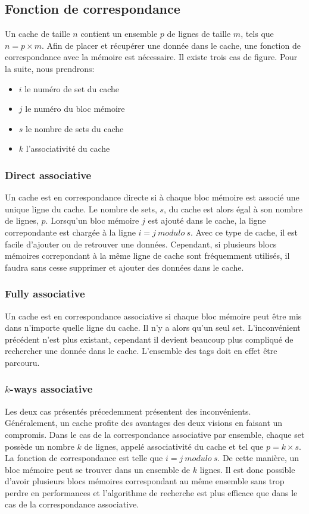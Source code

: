 \documentclass[a4paper]{article}
\begin{document}
\subsection{Fonction de correspondance}
\indent Un cache de taille $n$ contient un ensemble $p$ de lignes de taille $m$, tels que $n = p \times m$. Afin de placer et récupérer une donnée dans le cache, une fonction de correspondance avec la mémoire est nécessaire. Il existe trois cas de figure. Pour la suite, nous prendrons: \\
\begin{itemize}
\item $i$ le numéro de set du cache
\item $j$ le numéro du bloc mémoire
\item $s$ le nombre de sets du cache
\item $k$ l'associativité du cache 
\end{itemize}

\subsubsection{Direct associative}
\indent Un cache est en correspondance directe si à chaque bloc mémoire est associé une unique ligne du cache. Le nombre de sets, $s$, du cache est alors égal à son nombre de lignes, $p$. Lorsqu'un bloc mémoire $j$ est ajouté dans le cache, la ligne correpondante est chargée à la ligne $i = j\ modulo\ s$. Avec ce type de cache, il est facile d'ajouter ou de retrouver une données. Cependant, si plusieurs blocs mémoires correpondant à la même ligne de cache sont fréquemment utilisés, il faudra sans cesse supprimer et ajouter des données dans le cache.

\subsubsection{Fully associative}
\indent Un cache est en correspondance associative si chaque bloc mémoire peut être mis dans n'importe quelle ligne du cache. Il n'y a alors qu'un seul set. L'inconvénient précédent n'est plus existant, cependant il devient beaucoup plus compliqué de rechercher une donnée dans le cache. L'ensemble des tags doit en effet être parcouru.

\subsubsection{$k$-ways associative}
\indent Les deux cas présentés précedemment présentent des inconvénients. Généralement, un cache profite des avantages des deux visions en faisant un compromis. Dans le cas de la correspondance associative par ensemble, chaque set possède un nombre $k$ de lignes, appelé associativité du cache et tel que $p=k \times s$. La fonction de correspondance est telle que $i = j\ modulo\ s$. De cette manière, un bloc mémoire peut se trouver dans un ensemble de $k$ lignes. Il est donc possible d'avoir plusieurs blocs mémoires correspondant au même ensemble sans trop perdre en performances et l'algorithme de recherche est plus efficace que dans le cas de la correspondance associative.
\end{document}
